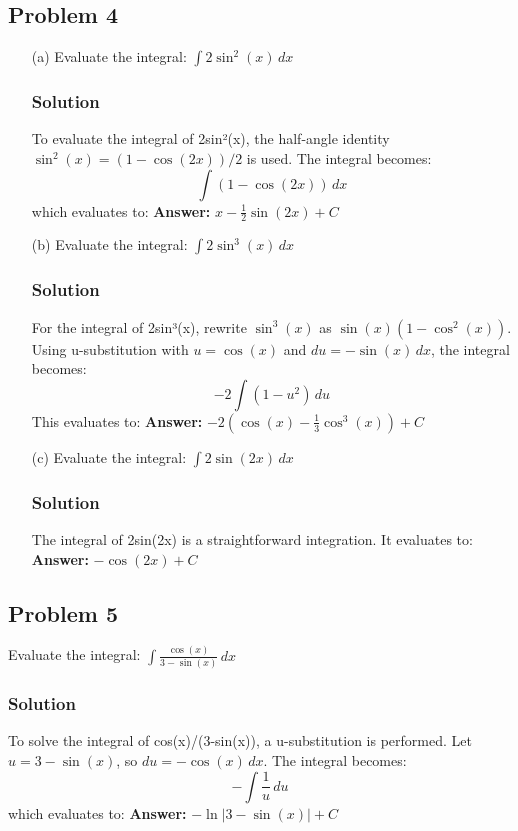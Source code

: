 \documentclass{article}
\begin{document}
\subsection{Problem 4}
\begin{enumerate}
    \item[(a)] Evaluate the integral: $ \int 2\sin^2(x) \,dx $
    \subsubsection*{Solution}
    To evaluate the integral of 2sin²(x), the half-angle identity $ \sin^2(x) = (1-\cos(2x))/2 $ is used. The integral becomes:
    \[ \int (1-\cos(2x)) \,dx \]
    which evaluates to:
    \textbf{Answer:} $ x - \frac{1}{2}\sin(2x) + C $

    \item[(b)] Evaluate the integral: $ \int 2\sin^3(x) \,dx $
    \subsubsection*{Solution}
    For the integral of 2sin³(x), rewrite $ \sin^3(x) $ as $ \sin(x)(1-\cos^2(x)) $. Using u-substitution with $ u = \cos(x) $ and $ du = -\sin(x) \,dx $, the integral becomes:
    \[ -2 \int (1-u^2) \,du \]
    This evaluates to:
    \textbf{Answer:} $ -2(\cos(x) - \frac{1}{3}\cos^3(x)) + C $

    \item[(c)] Evaluate the integral: $ \int 2\sin(2x) \,dx $
    \subsubsection*{Solution}
    The integral of 2sin(2x) is a straightforward integration. It evaluates to:
    \textbf{Answer:} $ -\cos(2x) + C $
\end{enumerate}


\subsection{Problem 5}
Evaluate the integral: $ \int \frac{\cos(x)}{3-\sin(x)} \,dx $
\subsubsection*{Solution}
To solve the integral of cos(x)/(3-sin(x)), a u-substitution is performed. Let $ u = 3-\sin(x) $, so $ du = -\cos(x) \,dx $. The integral becomes:
\[ -\int \frac{1}{u} \,du \]
which evaluates to:
\textbf{Answer:} $ -\ln|3-\sin(x)| + C $
\end{document}
